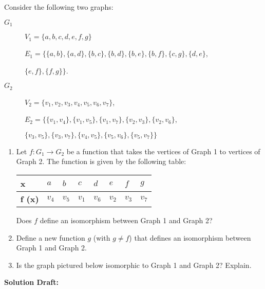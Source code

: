 \documentclass{article}
\begin{document}
Consider the following two graphs:%
\begin{description}
\item[{\(G_1\)}]\(V_1=\{a,b,c,d,e,f,g\}\)%
\par
\(E_1=\{\{a,b\},\{a,d\},\{b,c\},\{b,d\},\{b,e\},\{b,f\},\{c,g\},\{d,e\}\),%
\par
\(\{e,f\},\{f,g\}\}\).%
\item[{\(G_2\)}]\(V_2=\{v_1,v_2,v_3,v_4,v_5,v_6,v_7\}\),%
\par
\(E_2=\{\{v_1,v_4\},\{v_1,v_5\},\{v_1,v_7\},\{v_2,v_3\},\{v_2,v_6\}\),%
\par
\(\{v_3,v_5\},\{v_3,v_7\},\{v_4,v_5\},\{v_5,v_6\},\{v_5,v_7\}\}\)%
\end{description}
%
\begin{enumerate}[label= (\alph*)]
\item{}Let \(f:G_1 \rightarrow G_2\) be a function that takes the vertices of Graph 1 to vertices of Graph 2. The function is given by the following table:%
\begin{center}
\begin{tabular}{llllllll}
\textbf{x}&\(a\)&\(b\)&\(c\)&\(d\)&\(e\)&\(f\)&\(g\)\\
\hline
\textbf{f (x)}&\(v_4\)&\(v_5\)&\(v_1\)&\(v_6\)&\(v_2\)&\(v_3\)&\(v_7\)
\end{tabular}
\end{center}
%
Does \(f\) define an isomorphism between Graph 1 and Graph 2?%
\item{}Define a new function \(g\) (with \(g \ne f\)) that defines an isomorphism between Graph 1 and Graph 2.%
\item{}Is the graph pictured below isomorphic to Graph 1 and Graph 2? Explain.%
\begin{center}
\end{center}
\end{enumerate}

\vspace{0.5cm}
\noindent\textbf{Solution Draft:} 
\vspace{0.2cm}
\end{document}
